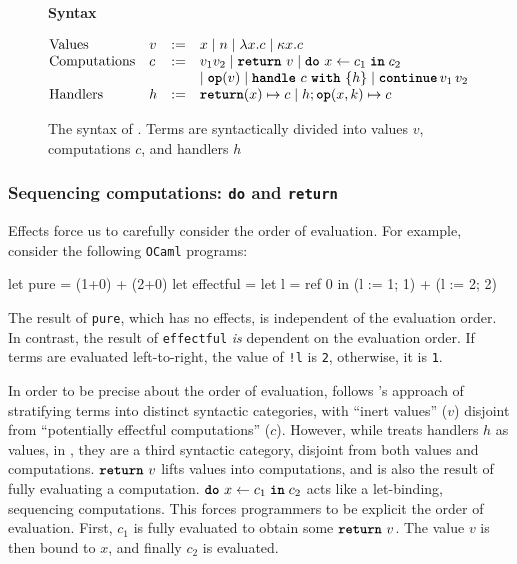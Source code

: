 \begin{figure}
  \begin{eff-desc}
    {\large{\textbf{Syntax}}}
\vspace{2mm}

  $\begin{array}{@{}llll}
  \text{Values} & v & := & x \mid n \mid \lambda x. c \mid \kappa x.c\\

  \text{Computations} & c & := & v_1 v_2 \mid \return{v} \mid \bind{x}{c_1}{c_2} \\
                             &&& \mid \op{v} \mid \handleWith{c}{h} \mid \continue{v_1}{v_2} \\ 
  \text{Handlers} & h & := &\returnHandler{x}{c} \mid h;\opHandler{x}{k}{c}
  \end{array}$
  
  \end{eff-desc}
  \caption{The syntax of \efflang. Terms are syntactically divided into values $v$, computations $c$, and handlers $h$ }
  \label{fig:eff-lang-syntax}
\end{figure}

\subsubsection{Sequencing computations: \texttt{do} and \texttt{return}}
Effects force us to carefully consider the order of evaluation. For example, consider the following \texttt{OCaml} programs:
\begin{ocaml}
let pure      = (1+0) + (2+0)
let effectful = let l = ref 0 in (l := 1; 1) + (l := 2; 2)
\end{ocaml}
The result of \texttt{pure}, which has no effects, is independent of the evaluation order. In contrast, the result of \texttt{effectful} \textit{is} dependent on the evaluation order. If terms are evaluated left-to-right, the value of \texttt{!l} is \texttt{2}, otherwise, it is \texttt{1}.

In order to be precise about the order of evaluation, \efflang{} follows \citeauthor{pretnar-15}'s approach of stratifying terms into distinct syntactic categories, with ``inert values'' ($v$) disjoint from ``potentially effectful computations'' ($c$). However, while \citeauthor{pretnar-15} treats handlers $h$ as values, in \efflang{}, they are a third syntactic category, disjoint from both values and computations. $\texttt{\textbf{return}} \,\, {v}$ lifts values into computations, and is also the result of fully evaluating a computation. $\texttt{\textbf{do}} \,\, {x} \leftarrow {c_1} \; \textbf{\texttt{in}} \; {c_2}$ acts like a let-binding, sequencing computations. This forces programmers to be explicit the order of evaluation.  First, $c_1$ is fully evaluated to obtain some $\texttt{\textbf{return}} \,\, {v}$. The value $v$ is then bound to $x$, and finally $c_2$ is evaluated. 

